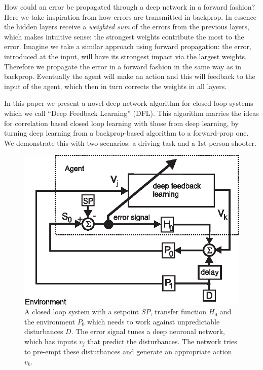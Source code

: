 \documentclass{aamas2018}
\begin{document}
How could an error be propagated through a deep network in a forward
fashion? Here we take inspiration from how errors are transmitted in
backprop. In essence the hidden layers receive a \textsl{weighted sum}
of the errors from the previous layers, which makes intuitive sense:
the strongest weights contribute the most to the error. Imagine we
take a similar approach using forward propagation: the error,
introduced at the input, will have its strongest impact via the
largest weights. Therefore we propagate the error in a forward fashion
in the same way as in backprop. Eventually the agent will make an
action and this will feedback to the input of the agent, which then in turn corrects the weights in all layers.

In this paper we present a novel deep network algorithm for closed
loop systems which we call ``Deep Feedback Learning'' (DFL). This
algorithm marries the ideas for correlation based closed loop learning
with those from deep learning, by turning deep learning from a
backprop-based algorithm to a forward-prop one. We demonstrate this
with two scenarios: a driving task and a 1st-person shooter.

\begin{figure}[!ht]
  \centering
  \includegraphics[width=0.9\columnwidth]{closed_loop}
  \caption{A closed loop system with a setpoint $SP$, transfer function $H_0$ and the
    environment $P_0$ which needs to work against unpredictable disturbances $D$.
    The error signal tunes a deep neuronal network, which has inputs
    $v_j$ that predict the disturbances. The network tries to pre-empt these
    disturbances and generate an appropriate action $v_k$.
    \label{closed_loop}}
\end{figure}
\end{document}
